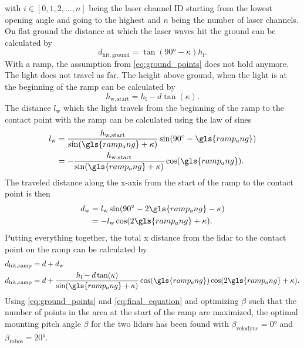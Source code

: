 with $i \in [0,1,2,\dots,n]$ being the laser channel ID starting from the lowest opening angle and going to the highest and $n$ being the number of laser channels.
On flat ground the distance at which the laser waves hit the ground can be calculated by
\begin{equation}
	d_\mathrm{hit,ground}  = \tan(\ang{90} - \kappa) h_\mathrm{l}.
	\label{eq:ground_points}
\end{equation}
With a ramp, the assumption from \cref{eq:ground_points} does not hold anymore.
The light does not travel as far.
The height above ground, when the light is at the beginning of the ramp can be calculated by
\begin{equation}
	h_\mathrm{w,start} = h_\mathrm{l} - d\tan(\kappa).
\end{equation}
The distance $l_\mathrm{w}$ which the light travels from the beginning of the ramp to the contact point with the ramp can be calculated using the law of sines
\begin{align}
	l_\mathrm{w} & = \frac{h_\mathrm{w,start} }{\sin(\gls{ramp_ang} + \kappa)} \sin(\ang{90} - \gls{ramp_ang}) \nonumber \\
	             & = -\frac{h_\mathrm{w,start} }{\sin(\gls{ramp_ang} + \kappa)} \cos(\gls{ramp_ang}).
\end{align}
The traveled distance along the x-axis from the start of the ramp to the contact point is then
\begin{align}
	d_\mathrm{w} & = l_\mathrm{w} \sin(\ang{90} - 2\gls{ramp_ang} - \kappa) \nonumber \\
	             & = -l_\mathrm{w} \cos(2\gls{ramp_ang} + \kappa).
\end{align}
Putting everything together, the total x distance from the \gls{lidar} to the contact point on the ramp can be calculated by
\begin{align}
	d_\mathrm{hit,ramp} & = d + d_\mathrm{w}                                                                                    \nonumber               \\
	d_\mathrm{hit,ramp} & = d + \frac{h_\mathrm{l} - d\tan(\kappa)}{\sin(\gls{ramp_ang} + \kappa)} \cos(\gls{ramp_ang}) \cos(2\gls{ramp_ang} + \kappa).
	\label{eq:final_equation}
\end{align}
Using \cref{eq:ground_points} and \cref{eq:final_equation} and optimizing $\beta$ such that the number of points in the area at the start of the ramp are maximized, the optimal mounting pitch angle $\beta$ for the two \glspl{lidar} has been found with $\beta_\mathrm{velodyne} = \ang{0}$ and $\beta_\mathrm{robos} = \ang{20}$.
